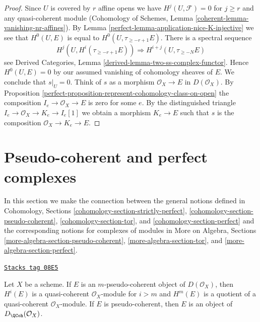 \begin{proof}

Since $U$ is covered by $r$ affine opens we have $H^j(U, \mathcal{F}) = 0$
for $j \geq r$ and any quasi-coherent module
(Cohomology of Schemes, Lemma \ref{coherent-lemma-vanishing-nr-affines}).
By Lemma \ref{perfect-lemma-application-nice-K-injective} we see that $H^0(U, E)$
is equal to $H^0(U, \tau_{\geq -r + 1}E)$. There is
a spectral sequence
$$
H^j(U, H^i(\tau_{\geq -r + 1}E)) \Rightarrow H^{i + j}(U, \tau_{\geq -N}E)
$$
see Derived Categories, Lemma \ref{derived-lemma-two-ss-complex-functor}.
Hence $H^0(U, E) = 0$ by our assumed vanishing of cohomology sheaves of $E$.
We conclude that $s|_U = 0$.
Think of $s$ as a morphism $\mathcal{O}_X \to E$ in $D(\mathcal{O}_X)$.
By Proposition \ref{perfect-proposition-represent-cohomology-class-on-open}
the composition $I_e \to \mathcal{O}_X \to E$ is zero for some $e$.
By the distinguished triangle $I_e \to \mathcal{O}_X \to K_e \to I_e[1]$
we obtain a morphism $K_e \to E$ such that $s$ is the composition
$\mathcal{O}_X \to K_e \to E$.
\end{proof}

\section{Pseudo-coherent and perfect complexes}
\label{perfect-section-spell-out}
In this section we make the connection between the general
notions defined in
Cohomology, Sections \ref{cohomology-section-strictly-perfect},
\ref{cohomology-section-pseudo-coherent},
\ref{cohomology-section-tor}, and
\ref{cohomology-section-perfect}
and the corresponding notions for complexes of modules in
More on Algebra, Sections
\ref{more-algebra-section-pseudo-coherent},
\ref{more-algebra-section-tor}, and
\ref{more-algebra-section-perfect}.

\begin{lemma}
\label{perfect-lemma-pseudo-coherent}
\href{https://stacks.math.columbia.edu/tag/08E5}{\texttt{Stacks tag 08E5}}

Let $X$ be a scheme. If $E$ is an $m$-pseudo-coherent
object of $D(\mathcal{O}_X)$, then $H^i(E)$ is a quasi-coherent
$\mathcal{O}_X$-module for $i > m$ and $H^m(E)$ is a quotient
of a quasi-coherent $\mathcal{O}_X$-module.
If $E$ is pseudo-coherent, then $E$ is an object of
$D_\QCoh(\mathcal{O}_X)$.
\end{lemma}

